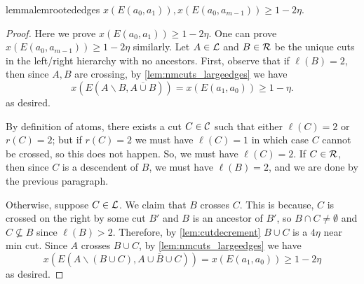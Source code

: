 \begin{restatable}{lemma}{lemrootededges}\label{lem:rootedgesarebig}
$x(E(a_0, a_1)), x(E(a_0, a_{m-1})) \geq 1-2\eta$.	
\end{restatable}
\begin{proof}
Here we prove $x(E(a_0,a_1))\geq 1-2\eta$. One can prove $x(E(a_0, a_{m-1})) \ge 1-2\eta$   similarly. Let $A\in {\cal L}$ and $B\in {\cal R}$ be the unique cuts in the left/right hierarchy with no ancestors.
First, observe that if $\ell(B)=2$, then since $A,B$ are crossing, by \cref{lem:nmcuts_largeedges} we have
$$x(E(A\smallsetminus B, \overline{A\cup B})) = x(E(a_1, a_0)) \geq 1-\eta.$$
as desired.

By definition of atoms, there exists a cut $C\in{\cal C}$ such that either $\ell(C)=2$ or $r(C)=2$; but if $r(C)=2$ we must have $\ell(C)=1$ in which case $C$ cannot be crossed, so this does not happen. So, we must have  $\ell(C)=2$. 	
If $C\in {\cal R}$, then since $C$ is a descendent of $B$, we must have $\ell(B)=2$, and we are done by the previous paragraph.

Otherwise, suppose $C\in {\cal L}$. 
We claim that $B$ crosses $C$. This is because, $C$ is crossed on the right by some cut $B'$ and $B$ is an ancestor of $B'$, so $B\cap C\neq \emptyset$ and $C\not\subseteq B$ since $\ell(B)>2$. 
Therefore, by \cref{lem:cutdecrement} $B\cup C$ is a $4\eta$ near min cut. Since $A$ crosses $B\cup C$, by \cref{lem:nmcuts_largeedges} we have
$$x(E(A\smallsetminus (B\cup C), \overline{A\cup B\cup C})) = x(E(a_1, a_0)) \geq 1-2\eta$$ 
as desired.
\end{proof}


